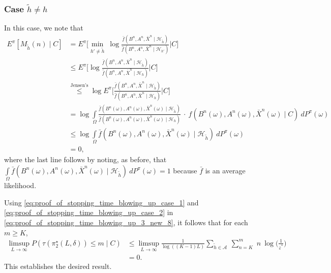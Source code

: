 \subsubsection{Case $\tilde{h} \neq h$}
In this case, we note that
\begin{align}
	E^\pi[M_{\tilde{h}}(n)\mid C]&=E^\pi\bigg[\min\limits_{h'\neq \tilde{h}}~\log \frac{\bar{f}(B^n, A^n, \bar{X}^n \mid \mathcal{H}_{\tilde{h}})}{\hat{f}(B^n, A^n, \bar{X}^n \mid \mathcal{H}_{h'})}\bigg \vert C \bigg]\nonumber\\
	&\leq E^\pi\bigg[\log \frac{\bar{f}(B^n, A^n, \bar{X}^n \mid \mathcal{H}_{\tilde{h}})}{\hat{f}(B^n, A^n, \bar{X}^n \mid \mathcal{H}_{h})}\bigg \vert C\bigg]\nonumber\\
	&\stackrel{\text{Jensen's}}{\leq} \log E^\pi\bigg[\frac{\bar{f}(B^n, A^n, \bar{X}^n \mid \mathcal{H}_{\tilde{h}})}{\hat{f}(B^n, A^n, \bar{X}^n \mid \mathcal{H}_{h})}\bigg \vert C\bigg]\nonumber\\
	&= \log  \int\limits_{\Omega} \frac{\bar{f}(B^n(\omega), A^n(\omega), \bar{X}^n(\omega) \mid \mathcal{H}_{\tilde{h}})}{\hat{f}(B^n(\omega), A^n(\omega), \bar{X}^n(\omega) \mid \mathcal{H}_{h})} ~\cdot ~ f(B^n(\omega), A^n(\omega), \bar{X}^n(\omega) \mid C)~dP^\pi(\omega)\nonumber\\
	& \leq \log \int\limits_{\Omega}\bar{f}(B^n(\omega), A^n(\omega), \bar{X}^n(\omega) \mid \mathcal{H}_{\tilde{h}})  ~dP^\pi(\omega)\nonumber\\
	& = 0,
	\label{eq:proof_of_stopping_time_blowing_up_case_2}
\end{align}
where the last line follows by noting, as before, that $\int\limits_{\Omega}\bar{f}(B^n(\omega), A^n(\omega), \bar{X}^n(\omega) \mid \mathcal{H}_{\tilde{h}})~dP^\pi(\omega)=1$ because $\bar{f}$ is an average likelihood.

Using \eqref{eq:proof_of_stopping_time_blowing_up_case_1} and \eqref{eq:proof_of_stopping_time_blowing_up_case_2} in \eqref{eq:proof_of_stopping_time_blowing_up_3_new_8}, it follows that for each $m\geq K$,
\begin{align}
	\limsup\limits_{L\to \infty}P(\tau(\pi_2^\star(L,\delta)) \leq m \mid C) &\leq \limsup\limits_{L \to \infty} \frac{1}{\log((K-1)L)}\sum\limits_{\tilde{h}\in \mathcal{A}}~\sum\limits_{n=K}^{m}\,\,n~\log \bigg(\frac{1}{\bar{\varepsilon}^*}\bigg)\nonumber\\
	&=0.
	\label{eq:proof_of_stopping_time_blowing_up_11}
\end{align}
This establishes the desired result.

